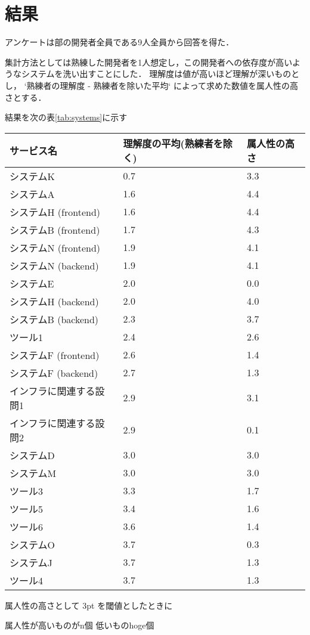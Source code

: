 \section{結果}
アンケートは部の開発者全員である9人全員から回答を得た．

集計方法としては熟練した開発者を1人想定し，この開発者への依存度が高いようなシステムを洗い出すことにした．
理解度は値が高いほど理解が深いものとし， `熟練者の理解度 - 熟練者を除いた平均` によって求めた数値を属人性の高さとする．

結果を次の表\ref{tab:systems}に示す\newline

\scriptsize
\begin{tabular}{|p{2.8cm}|p{2.2cm}|p{1.4cm}|} %
    \hline
    \textbf{サービス名} & \textbf{理解度の平均(熟練者を除く)} & \textbf{属人性の高さ} \\
    \hline
    システムK & 0.7 & 3.3 \\
    \hline
    システムA & 1.6 & 4.4 \\
    \hline
    システムH (frontend) & 1.6 & 4.4 \\
    \hline
    システムB (frontend) & 1.7 & 4.3 \\
    \hline
    システムN (frontend) & 1.9 & 4.1 \\
    \hline
    システムN (backend) & 1.9 & 4.1 \\
    \hline
    システムE & 2.0 & 0.0 \\
    \hline
    システムH (backend) & 2.0 & 4.0 \\
    \hline
    システムB (backend) & 2.3 & 3.7 \\
    \hline
    ツール1 & 2.4 & 2.6 \\
    \hline
    システムF (frontend) & 2.6 & 1.4 \\
    \hline
    システムF (backend) & 2.7 & 1.3 \\
    \hline
    インフラに関連する設問1 & 2.9 & 3.1 \\
    \hline
    インフラに関連する設問2 & 2.9 & 0.1 \\
    \hline
    システムD & 3.0 & 3.0 \\
    \hline
    システムM & 3.0 & 3.0 \\
    \hline
    ツール3 & 3.3 & 1.7 \\
    \hline
    ツール5 & 3.4 & 1.6 \\
    \hline
    ツール6 & 3.6 & 1.4 \\
    \hline
    システムO & 3.7 & 0.3 \\
    \hline
    システムJ & 3.7 & 1.3 \\
    \hline
    ツール4 & 3.7 & 1.3 \\
    \hline
\end{tabular}
\vspace{0.1cm} %
\label{tab:systems}
\normalsize %
\vspace{0.3cm}


属人性の高さとして 3pt を閾値としたときに

属人性が高いものがn個
低いものhoge個





